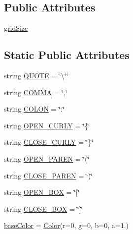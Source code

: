\subsection*{Public Attributes}
\begin{DoxyCompactItemize}
\item 
\mbox{\hyperlink{classbridges_1_1color__grid_1_1_color_grid_a1144d58ebd7578e47e5a8746f82ef2c4}{grid\+Size}}
\end{DoxyCompactItemize}
\subsection*{Static Public Attributes}
\begin{DoxyCompactItemize}
\item 
string \mbox{\hyperlink{classbridges_1_1color__grid_1_1_color_grid_aa04754ccd3208b64eb3ad7b13e4b0315}{Q\+U\+O\+TE}} = \char`\"{}\textbackslash{}\char`\"{}\char`\"{}
\item 
string \mbox{\hyperlink{classbridges_1_1color__grid_1_1_color_grid_a2d8833a66352ef424427cbf0b37a546c}{C\+O\+M\+MA}} = \char`\"{},\char`\"{}
\item 
string \mbox{\hyperlink{classbridges_1_1color__grid_1_1_color_grid_af86e0c070a2e69d3801d261b1e0e1e43}{C\+O\+L\+ON}} = \char`\"{}\+:\char`\"{}
\item 
string \mbox{\hyperlink{classbridges_1_1color__grid_1_1_color_grid_a72d74aa84fe5e8933077797f02c6f025}{O\+P\+E\+N\+\_\+\+C\+U\+R\+LY}} = \char`\"{}\{\char`\"{}
\item 
string \mbox{\hyperlink{classbridges_1_1color__grid_1_1_color_grid_a8b8c765951276669e7174f57b6e6a297}{C\+L\+O\+S\+E\+\_\+\+C\+U\+R\+LY}} = \char`\"{}\}\char`\"{}
\item 
string \mbox{\hyperlink{classbridges_1_1color__grid_1_1_color_grid_aa9cf473f9df8ec2e9b885d830cad1b11}{O\+P\+E\+N\+\_\+\+P\+A\+R\+EN}} = \char`\"{}(\char`\"{}
\item 
string \mbox{\hyperlink{classbridges_1_1color__grid_1_1_color_grid_a7f9e5efe3764e44eb2ae67cfb3ed3ab0}{C\+L\+O\+S\+E\+\_\+\+P\+A\+R\+EN}} = \char`\"{})\char`\"{}
\item 
string \mbox{\hyperlink{classbridges_1_1color__grid_1_1_color_grid_a61b53ebe64497c9da17d09b70f984ffc}{O\+P\+E\+N\+\_\+\+B\+OX}} = \char`\"{}\mbox{[}\char`\"{}
\item 
string \mbox{\hyperlink{classbridges_1_1color__grid_1_1_color_grid_a15c83f2af647ad43478ab0aa9a15c220}{C\+L\+O\+S\+E\+\_\+\+B\+OX}} = \char`\"{}\mbox{]}\char`\"{}
\item 
\mbox{\hyperlink{classbridges_1_1color__grid_1_1_color_grid_ad2db62703be80114e46b490ff02f8bd9}{base\+Color}} = \mbox{\hyperlink{classbridges_1_1color_1_1_color}{Color}}(r=0, g=0, b=0, a=1.)
\end{DoxyCompactItemize}


